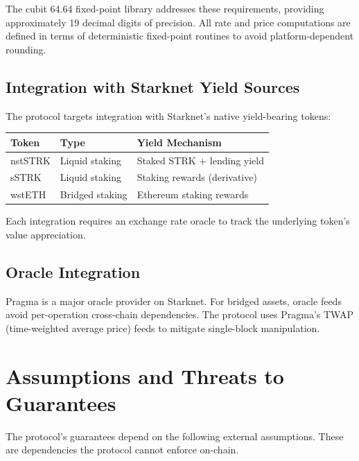 The cubit 64.64 fixed-point library addresses these requirements, providing approximately 19 decimal digits of precision. All rate and price computations are defined in terms of deterministic fixed-point routines to avoid platform-dependent rounding.

\subsection{Integration with Starknet Yield Sources}

The protocol targets integration with Starknet's native yield-bearing tokens:

\begin{center}
\begin{tabular}{lll}
\toprule
\textbf{Token} & \textbf{Type} & \textbf{Yield Mechanism} \\
\midrule
nstSTRK & Liquid staking & Staked STRK + lending yield \\
sSTRK & Liquid staking & Staking rewards (derivative) \\
wstETH & Bridged staking & Ethereum staking rewards \\
\bottomrule
\end{tabular}
\end{center}

Each integration requires an exchange rate oracle to track the underlying token's value appreciation.

\subsection{Oracle Integration}

Pragma is a major oracle provider on Starknet. For bridged assets, oracle feeds avoid per-operation cross-chain dependencies. The protocol uses Pragma's TWAP (time-weighted average price) feeds to mitigate single-block manipulation.

\section{Assumptions and Threats to Guarantees}

The protocol's guarantees depend on the following external assumptions. These are dependencies the protocol cannot enforce on-chain.

